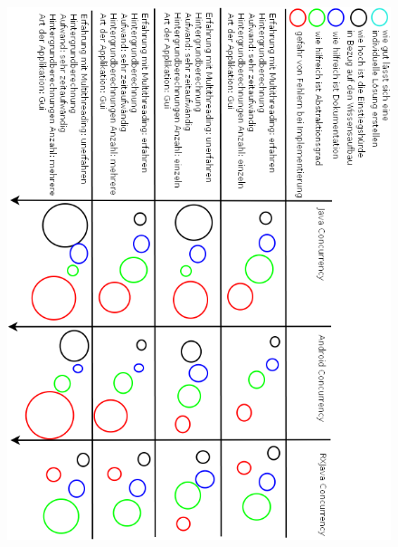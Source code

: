 \documentclass[12pt,oneside,a4paper,bibtotoc,liststotoc]{scrreprt}
\begin{document}
\begin{figure}[H]
  \begin{centering}
    \includegraphics[width=1\textwidth]{img/szenarioBasedAnalysis.png}
    \label{szenarioBasedAnalysis}
  \end{centering}
\end{figure}
\newpage
\end{document}

